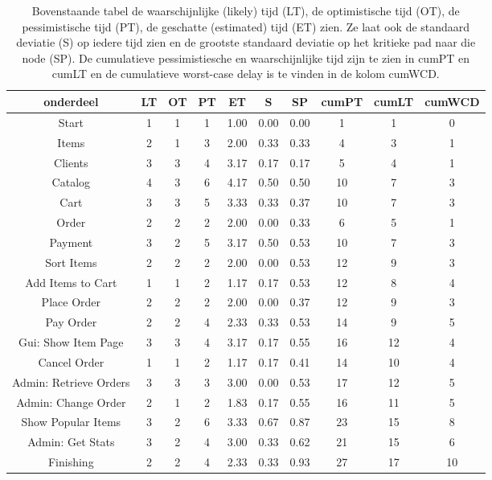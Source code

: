 \documentclass[•]{article}
\begin{document}
\begin{table}
\centering
\begin{tabular}{|c|c|c|c|c|c|c|c|c|c|}
\hline
onderdeel	&	LT	&	OT	&	PT	&	ET	&	S	&	SP	&	cumPT	&	cumLT	&	cumWCD	\\
\hline
Start	&	1	&	1	&	1	&	1.00	&	0.00	&	0.00	&	1	&	1	&	0	\\
Items	&	2	&	1	&	3	&	2.00	&	0.33	&	0.33	&	4	&	3	&	1	\\
Clients	&	3	&	3	&	4	&	3.17	&	0.17	&	0.17	&	5	&	4	&	1	\\
Catalog	&	4	&	3	&	6	&	4.17	&	0.50	&	0.50	&	10	&	7	&	3	\\
Cart	&	3	&	3	&	5	&	3.33	&	0.33	&	0.37	&	10	&	7	&	3	\\
Order	&	2	&	2	&	2	&	2.00	&	0.00	&	0.33	&	6	&	5	&	1	\\
Payment	&	3	&	2	&	5	&	3.17	&	0.50	&	0.53	&	10	&	7	&	3	\\
Sort Items	&	2	&	2	&	2	&	2.00	&	0.00	&	0.53	&	12	&	9	&	3	\\
Add Items to Cart	&	1	&	1	&	2	&	1.17	&	0.17	&	0.53	&	12	&	8	&	4	\\
Place Order	&	2	&	2	&	2	&	2.00	&	0.00	&	0.37	&	12	&	9	&	3	\\
Pay Order	&	2	&	2	&	4	&	2.33	&	0.33	&	0.53	&	14	&	9	&	5	\\
Gui: Show Item Page	&	3	&	3	&	4	&	3.17	&	0.17	&	0.55	&	16	&	12	&	4	\\
Cancel Order	&	1	&	1	&	2	&	1.17	&	0.17	&	0.41	&	14	&	10	&	4	\\
Admin: Retrieve Orders	&	3	&	3	&	3	&	3.00	&	0.00	&	0.53	&	17	&	12	&	5	\\
Admin: Change Order	&	2	&	1	&	2	&	1.83	&	0.17	&	0.55	&	16	&	11	&	5	\\
Show Popular Items	&	3	&	2	&	6	&	3.33	&	0.67	&	0.87	&	23	&	15	&	8	\\
Admin: Get Stats	&	3	&	2	&	4	&	3.00	&	0.33	&	0.62	&	21	&	15	&	6	\\
Finishing	&	2	&	2	&	4	&	2.33	&	0.33	&	0.93	&	27	&	17	&	10	\\


\hline
\end{tabular}
\caption{Bovenstaande tabel de waarschijnlijke (likely) tijd (LT), de optimistische tijd (OT), de pessimistische tijd (PT), de geschatte (estimated) tijd (ET) zien. Ze laat ook de standaard deviatie (S) op iedere tijd zien en de grootste standaard deviatie op het kritieke pad naar die node (SP). De cumulatieve pessimistiesche en waarschijnlijke tijd zijn te zien in cumPT en cumLT en de cumulatieve worst-case delay is te vinden in de kolom cumWCD.}
\label{tbl_delay}
\end{table}
\end{document}
